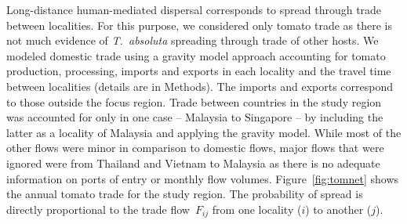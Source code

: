 \documentclass[11pt]{article}
\newcommand{\tuta}{\emph{T.~absoluta}}
\theoremstyle{definition}
\begin{document}
Long-distance human-mediated dispersal corresponds to spread through trade
between localities. For this purpose, we considered only tomato trade as
there is not much evidence of \tuta{} spreading through trade of other
hosts. We modeled domestic trade using a gravity model approach accounting
for tomato production, processing, imports and exports in each locality and
the travel time between localities (details are in Methods). The imports
and exports correspond to those outside the focus region. Trade between
countries in the study region was accounted for only in one case --
Malaysia to Singapore -- by including the latter as a locality of Malaysia
and applying the gravity model. While most of the other flows were minor in
comparison to domestic flows, major flows that were ignored were from
Thailand and Vietnam to Malaysia as there is no adequate information on
ports of entry or monthly flow volumes. Figure~\ref{fig:tomnet} shows the
annual tomato trade for the study region.
The probability of spread is directly proportional to the trade
flow~$F_{ij}$ from one locality ($i$) to another ($j$).
\end{document}

